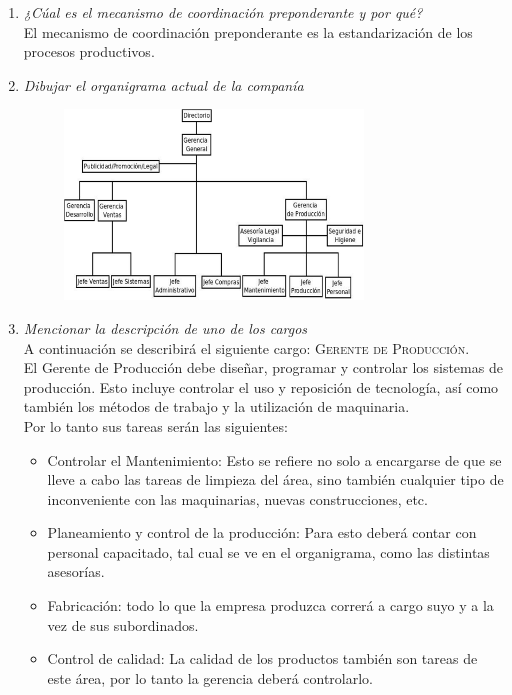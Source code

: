 \documentclass[a4paper,10pt]{article}
\begin{document}
\begin{enumerate}
			
			\item \textit{¿Cúal es el mecanismo de coordinación preponderante y por qué?}\\
			El mecanismo de coordinación preponderante es la estandarización de los procesos productivos.\\
						
			\item \textit{Dibujar el organigrama actual de la companía}\\
			\begin{figure}[!h]
			\includegraphics[width=0.75\textwidth]{imagenes/orgaLosGringos.png}
			\end{figure}			
			\item \textit{Mencionar la descripción de uno de los cargos}\\
			A continuación se describirá el siguiente cargo: \textsc{Gerente de Producción}.\\
			El Gerente de Producción debe diseñar, programar y controlar los sistemas de producción. Esto incluye controlar el uso y reposición de tecnología, así como también los métodos de trabajo y la utilización de maquinaria.\\
			Por lo tanto sus tareas serán las siguientes:
			\begin{itemize}
				\item Controlar el Mantenimiento: Esto se refiere no solo a encargarse de que se lleve a cabo las tareas de limpieza del área, sino también cualquier tipo de inconveniente con las maquinarias, nuevas construcciones, etc.
				\item Planeamiento y control de la producción: Para esto deberá contar con personal capacitado, tal cual se ve en el organigrama, como las distintas asesorías.
				\item Fabricación: todo lo que la empresa produzca correrá a cargo suyo y a la vez de sus subordinados.
				\item Control de calidad: La calidad de los productos también son tareas de este área, por lo tanto la gerencia deberá controlarlo. 
			\end{itemize}
			

\end{enumerate}
\end{document}
